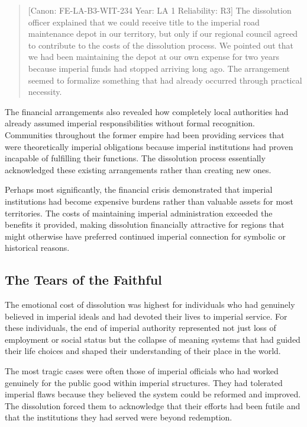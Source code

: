 \begin{quote}
{[}Canon: FE-LA-B3-WIT-234 \textbar{} Year: LA 1 \textbar{} Reliability:
R3{]} The dissolution officer explained that we could receive title to
the imperial road maintenance depot in our territory, but only if our
regional council agreed to contribute to the costs of the dissolution
process. We pointed out that we had been maintaining the depot at our
own expense for two years because imperial funds had stopped arriving
long ago. The arrangement seemed to formalize something that had already
occurred through practical necessity.
\end{quote}

The financial arrangements also revealed how completely local
authorities had already assumed imperial responsibilities without formal
recognition. Communities throughout the former empire had been providing
services that were theoretically imperial obligations because imperial
institutions had proven incapable of fulfilling their functions. The
dissolution process essentially acknowledged these existing arrangements
rather than creating new ones.

Perhaps most significantly, the financial crisis demonstrated that
imperial institutions had become expensive burdens rather than valuable
assets for most territories. The costs of maintaining imperial
administration exceeded the benefits it provided, making dissolution
financially attractive for regions that might otherwise have preferred
continued imperial connection for symbolic or historical reasons.

\subsection{The Tears of the Faithful}\label{the-tears-of-the-faithful}

The emotional cost of dissolution was highest for individuals who had
genuinely believed in imperial ideals and had devoted their lives to
imperial service. For these individuals, the end of imperial authority
represented not just loss of employment or social status but the
collapse of meaning systems that had guided their life choices and
shaped their understanding of their place in the world.

The most tragic cases were often those of imperial officials who had
worked genuinely for the public good within imperial structures. They
had tolerated imperial flaws because they believed the system could be
reformed and improved. The dissolution forced them to acknowledge that
their efforts had been futile and that the institutions they had served
were beyond redemption.

